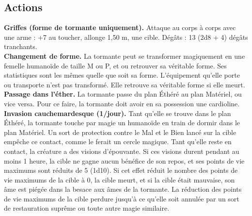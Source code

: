 \begin{figure*}[hb!]
{\begin{minipage}[c]{.45\linewidth}
    \subsection*{Actions}
    {\bfseries Griffes (forme de tormante uniquement).} Attaque au corps à corps avec une arme : +7 au toucher, allonge 1,50 m, une cible. Dégâts : 13 (2d8 + 4) dégâts tranchants. \\
    {\bfseries Changement de forme.} La tormante peut se transformer magiquement en une femelle humanoïde de taille M ou P, et ou retrouver sa véritable forme. Ses statistiques sont les mêmes quelle que soit sa forme. L'équipement qu'elle porte ou transporte n'est pas transformé. Elle retrouve sa véritable forme si elle meurt. \\
    {\bfseries Passage dans l'éther.} La tormante passe du plan Éthéré au plan Matériel, ou vice versa. Pour ce faire, la tormante doit avoir en sa possession une cardioline. \\
    {\bfseries Invasion cauchemardesque (1/jour).} Tant qu'elle se trouve dans le plan Éthéré, la tormante touche par magie un humanoïde en train de dormir dans le plan Matériel. Un sort de protection contre le Mal et le Bien lancé sur la cible empêche ce contact, comme le ferait un cercle magique. Tant qu'elle reste en contact, la créature a des visions d'épouvante. Si ces visions durent pendant au moins 1 heure, la cible ne gagne aucun bénéfice de son repos, et ses points de vie maximums sont réduits de 5 (1d10). Si cet effet réduit le nombre des points de vie maximums de la cible à 0, la cible meurt, et si la cible était mauvaise, son âme est piégée dans la besace aux âmes de la tormante. La réduction des points de vie maximums de la cible perdure jusqu'à ce qu'elle soit annulée par un sort de restauration suprême ou toute autre magie similaire. 
  \end{minipage}
}%
\end{figure*}

